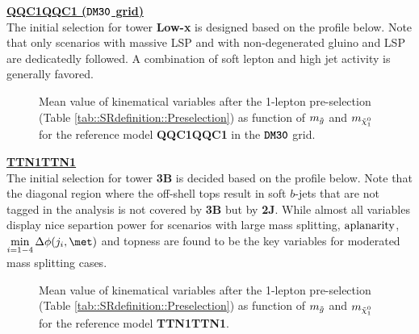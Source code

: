 \clearpage
\noindent \underline{\textbf{QQC1QQC1 ($\mathrm{\textbf{\texttt{DM30}}}$ grid)}} \\ 
The initial selection for tower \textbf{Low-x} is designed based on the profile below.
Note that only scenarios with massive LSP and with non-degenerated gluino and LSP are dedicatedly followed.
A combination of soft lepton and high jet activity is generally favored.
\begin{figure}[h]
  \centering
    \caption{ 
      Mean value of kinematical variables after the 1-lepton pre-selection (Table \ref{tab::SRdefinition::Preselection}) as function of $m_{\tilde{g}}$ and $m_{\tilde{\chi}_{1}^{0}}$ for the reference model \textbf{QQC1QQC1} in the $\mathrm{\textbf{\texttt{DM30}}}$ grid.
    }
    \label{fig::SRdefinition::kineMap_QQC1QQC1_dM30} 
\end{figure}

\clearpage
\noindent \underline{\textbf{TTN1TTN1}} \\ 
The initial selection for tower \textbf{3B} is decided based on the profile below.
Note that the diagonal region where the off-shell tops result in soft $b$-jets that are not tagged in the analysis is not covered by \textbf{3B} but by \textbf{2J}. While almost all variables display nice separtion power for scenarios with large mass splitting,
$\mathrm{aplanarity}$, $\mindPhiFourJet$ and topness are found to be the key variables for moderated  mass splitting cases.
\begin{figure}[h]
  \centering
    \caption{ 
      Mean value of kinematical variables after the 1-lepton pre-selection (Table \ref{tab::SRdefinition::Preselection}) as function of $m_{\tilde{g}}$ and $m_{\tilde{\chi}_{1}^{0}}$ for the reference model \textbf{TTN1TTN1}. 
    }
    \label{fig::SRdefinition::kineMap_TTN1TTN1} 
\end{figure}
